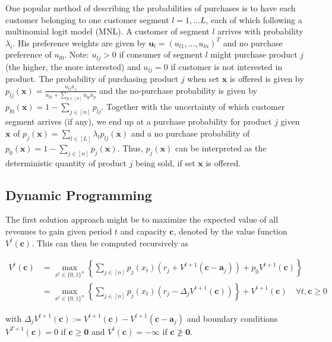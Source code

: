 One popular method of describing the probabilities of purchases is to have each customer belonging to one customer segment $l = 1, \dots L$, each of which following a multinomial logit model (MNL). A customer of segment $l$ arrives with probability $\lambda_i$. His preference weights are given by $\boldsymbol{u}_l = (u_{l1}, \dots, u_{ln})^T$ and no purchase preference of $u_{l0}$. Note: $u_{lj} > 0$ if consumer of segment $l$ might purchase product $j$ (the higher, the more interested) and $u_{lj} = 0$ if customer is not interested in product. The probability of purchasing product $j$ when set $\boldsymbol{x}$ is offered is given by $p_{lj}(\boldsymbol{x}) = \frac{u_{lj}x_j}{u_{l0} + \sum_{p\in[n]} u_{lp}x_p}$ and the no-purchase probability is given by $p_{l0}(\boldsymbol{x}) = 1 - \sum_{j\in[n]}p_{lj}$. Together with the uncertainty of which customer segment arrives (if any), we end up at a purchase probability for product $j$ given $\boldsymbol{x}$ of $p_j(\boldsymbol{x}) = \sum_{l \in [L]} \lambda_l p_{lj}(\boldsymbol{x})$ and a no purchase probability of $p_0(\boldsymbol{x}) = 1-\sum_{j\in[n]}p_j(\boldsymbol{x}) $. Thus, $p_j(\boldsymbol{x})$ can be interpreted as the deterministic quantity of product $j$ being sold, if set $\boldsymbol{x}$ is offered.

\subsection{Dynamic Programming}

The first solution approach might be to maximize the expected value of all revenues to gain given period $t$ and capacity $\boldsymbol{c}$, denoted by the value function $V^t(\boldsymbol{c})$. This can then be computed recursively as

\begin{align}
	V^t(\boldsymbol{c}) &= \max_{x^t \in \{0,1\}^n}\left\{ \sum_{j \in [n]} p_j(x_t) \left( r_j + V^{t+1}(\boldsymbol{c} - \boldsymbol{a}_j) \right) + p_0 V^{t+1}(\boldsymbol{c}) \right\} \\
	&= \max_{x^t \in \{0,1\}^n}\left\{ \sum_{j \in [n]} p_j(x_t) \left( r_j - \Delta_j V^{t+1}(\boldsymbol{c}) \right) \right\} + V^{t+1}(\boldsymbol{c})\quad \forall t, \boldsymbol{c} \geq 0
\end{align}

with $\Delta_j V^{t+1}(\boldsymbol{c}) := V^{t+1}(\boldsymbol{c}) - V^{t+1}(\boldsymbol{c} - \boldsymbol{a}_j)$ and boundary conditions $V^{T+1}(\boldsymbol{c}) = 0$ if $\boldsymbol{c} \geq \boldsymbol{0}$ and $V^t(\boldsymbol{c}) = - \infty$ if $\boldsymbol{c} \ngeq \boldsymbol{0}$.


